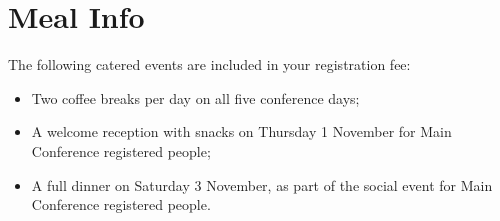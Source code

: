 \setheaders{}{}
\section{Meal Info}{}

The following catered events are included in your registration fee:

\begin{itemize}
    \item  Two coffee breaks per day on all five conference days;
    \item  A welcome reception with snacks on Thursday 1 November for Main
   Conference registered people; 
\item  A full dinner on Saturday 3 November, as part of the social event for
   Main Conference registered people.
\end{itemize}
